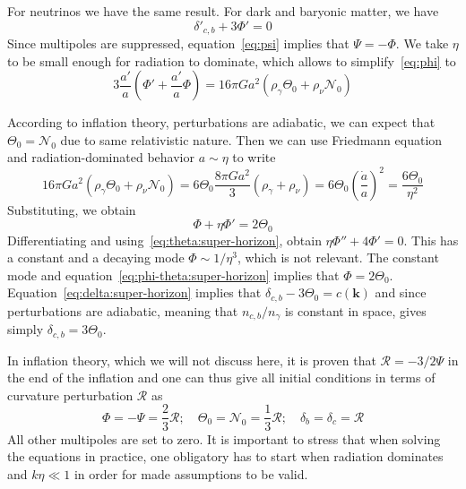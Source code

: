 \documentclass[12pt]{extarticle}
\numberwithin{problem}{section}
\numberwithin{theorem}{section}
\begin{document}
	For neutrinos we have the same result. For dark and baryonic matter, we have
	\begin{equation}
		\label{eq:delta:super-horizon}
		\delta'_{c,b} + 3\Phi' = 0
	\end{equation}
	Since multipoles are suppressed, equation~\ref{eq:psi} implies that $\Psi = -\Phi$. We take $\eta$ to be small enough for radiation to dominate, which allows to simplify~\ref{eq:phi} to
	\begin{equation}
		3\frac{a'}{a}(\Phi' + \frac{a'}{a}\Phi) = 16\pi Ga^2(\rho_\gamma\Theta_0 + \rho_\nu\mathcal{N}_0)
	\end{equation}

	According to inflation theory, perturbations are adiabatic, we can expect that $\Theta_0 = \mathcal{N}_0$ due to same relativistic nature. Then we can use Friedmann equation and radiation-dominated behavior $a\sim\eta$ to write
	\begin{equation}
		16\pi Ga^2(\rho_\gamma\Theta_0 + \rho_\nu\mathcal{N}_0) = 6\Theta_0\frac{8\pi Ga^2}{3}(\rho_\gamma + \rho_\nu) = 6\Theta_0\left(\frac{\dot{a}}{a}\right)^2 = \frac{6\Theta_0}{\eta^2}
	\end{equation}
	Substituting, we obtain 
	\begin{equation}
		\label{eq:phi-theta:super-horizon}
		\Phi + \eta\Phi' = 2\Theta_0
	\end{equation} Differentiating and using~\ref{eq:theta:super-horizon}, obtain $\eta\Phi'' + 4\Phi' = 0$. This has a constant and a decaying mode $\Phi\sim1/\eta^3$, which is not relevant. The constant mode and equation~\ref{eq:phi-theta:super-horizon} implies that $\Phi = 2\Theta_0$. Equation~\ref{eq:delta:super-horizon} implies that $\delta_{c,b} - 3\Theta_0 = c(\mathbf{k})$ and since perturbations are adiabatic, meaning that $n_{c,b} / n_\gamma$ is constant in space, gives simply $\delta_{c,b} = 3\Theta_0$.

	In inflation theory, which we will not discuss here, it is proven that $\mathcal{R} = -3/2\Psi$ in the end of the inflation and one can thus give all initial conditions in terms of curvature perturbation $\mathcal{R}$ as
	\begin{equation}
		\Phi = -\Psi = \frac{2}{3}\mathcal{R};\quad \Theta_0 = \mathcal{N}_0 = \frac{1}{3}\mathcal{R};\quad \delta_b = \delta_c = \mathcal{R}
	\end{equation}
	All other multipoles are set to zero. It is important to stress that when solving the equations in practice, one obligatory has to start when radiation dominates and $k\eta\ll 1$ in order for made assumptions to be valid.
\end{document}
